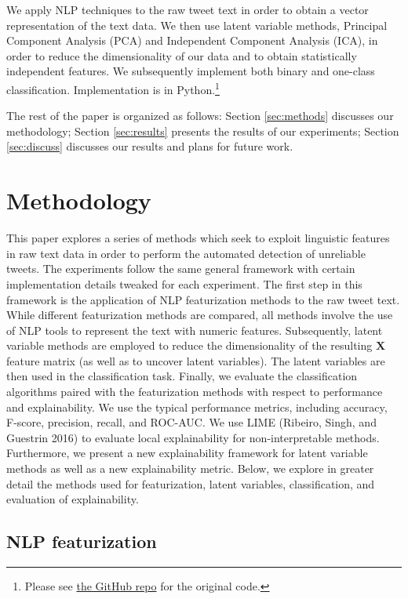 \documentclass{article}
\begin{document}
We apply NLP techniques to the raw tweet text in order to obtain a
vector representation of the text data. We then use latent variable
methods, Principal Component Analysis (PCA) and Independent Component
Analysis (ICA), in order to reduce the dimensionality of our data and to
obtain statistically independent features. We subsequently implement
both binary and one-class classification. Implementation is in
Python.\footnote{Please see
  \href{https://github.com/caitmmoroney/Practicum_COVIDMisinfo/tree/main/Code}{the
  GitHub repo} for the original code.}

The rest of the paper is organized as follows: Section \ref{sec:methods}
discusses our methodology; Section \ref{sec:results} presents the
results of our experiments; Section \ref{sec:discuss} discusses our
results and plans for future work.

\hypertarget{methodology}{%
\section{Methodology}\label{methodology}}

\label{sec:methods} This paper explores a series of methods which seek
to exploit linguistic features in raw text data in order to perform the
automated detection of unreliable tweets. The experiments follow the
same general framework with certain implementation details tweaked for
each experiment. The first step in this framework is the application of
NLP featurization methods to the raw tweet text. While different
featurization methods are compared, all methods involve the use of NLP
tools to represent the text with numeric features. Subsequently, latent
variable methods are employed to reduce the dimensionality of the
resulting \(\mathbf{X}\) feature matrix (as well as to uncover latent
variables). The latent variables are then used in the classification
task. Finally, we evaluate the classification algorithms paired with the
featurization methods with respect to performance and explainability. We
use the typical performance metrics, including accuracy, F-score,
precision, recall, and ROC-AUC. We use LIME (Ribeiro, Singh, and
Guestrin 2016) to evaluate local explainability for non-interpretable
methods. Furthermore, we present a new explainability framework for
latent variable methods as well as a new explainability metric. Below,
we explore in greater detail the methods used for featurization, latent
variables, classification, and evaluation of explainability.

\hypertarget{nlp-featurization}{%
\subsection{NLP featurization}\label{nlp-featurization}}
\end{document}
